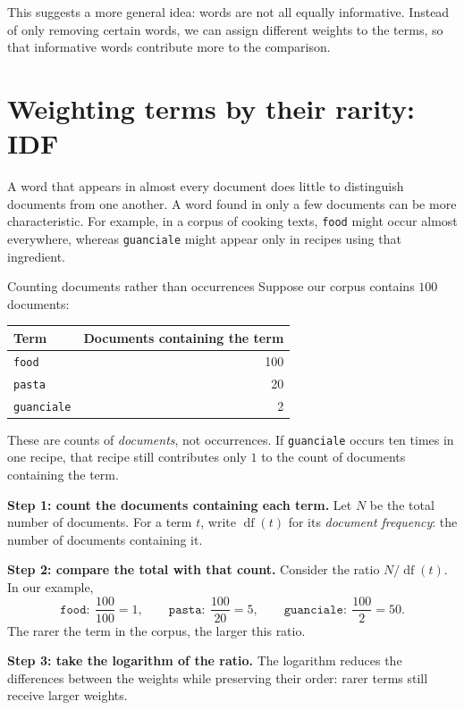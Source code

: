 \documentclass[a4paper,12pt,oneside]{report}
\begin{document}
This suggests a more general idea: words are not all equally
informative. Instead of only removing certain words, we can assign
different weights to the terms, so that informative words contribute
more to the comparison.

\section{Weighting terms by their rarity: IDF}

A word that appears in almost every document does little to distinguish
documents from one another. A word found in only a few documents can
be more characteristic. For example, in a corpus of cooking texts,
\texttt{food} might occur almost everywhere, whereas \texttt{guanciale}
might appear only in recipes using that ingredient.

\begin{framedexample}{Counting documents rather than occurrences}
Suppose our corpus contains $100$ documents:
\begin{center}
\begin{tabular}{l|r}
  Term & Documents containing the term\\\hline
  \texttt{food} & 100\\
  \texttt{pasta} & 20\\
  \texttt{guanciale} & 2
\end{tabular}
\end{center}
These are counts of \emph{documents}, not occurrences. If
\texttt{guanciale} occurs ten times in one recipe, that recipe still
contributes only $1$ to the count of documents containing the term.
\end{framedexample}

\textbf{Step 1: count the documents containing each term.}
Let $N$ be the total number of documents. For a term $t$, write
$\operatorname{df}(t)$ for its \emph{document frequency}: the number
of documents containing it.

\textbf{Step 2: compare the total with that count.}
Consider the ratio $N/\operatorname{df}(t)$. In our example,
\[
  \texttt{food}:\ \frac{100}{100}=1,\qquad
  \texttt{pasta}:\ \frac{100}{20}=5,\qquad
  \texttt{guanciale}:\ \frac{100}{2}=50.
\]
The rarer the term in the corpus, the larger this ratio.

\textbf{Step 3: take the logarithm of the ratio.}
The logarithm reduces the differences between the weights while
preserving their order: rarer terms still receive larger weights.
\end{document}
